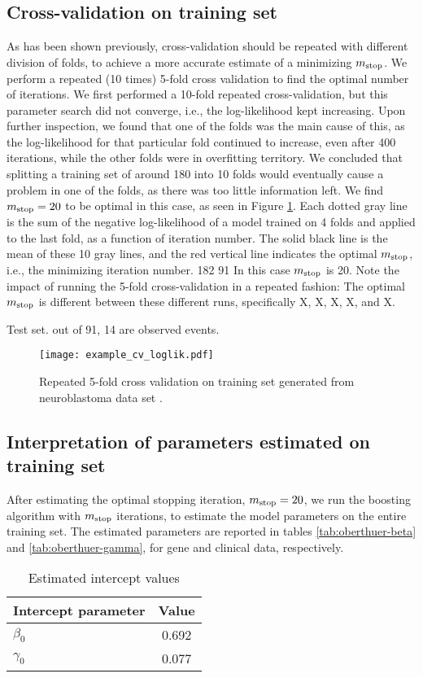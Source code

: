 \subsection{Cross-validation on training set}
As has been shown previously, cross-validation should be repeated with different division of folds, to achieve a more accurate estimate of a minimizing $m_{\text{stop}}$.
We perform a repeated (10 times) 5-fold cross validation to find the optimal number of iterations.
We first performed a 10-fold repeated cross-validation, but this parameter search did not converge, i.e., the log-likelihood kept increasing.
Upon further inspection, we found that one of the folds was the main cause of this, as the log-likelihood for that particular fold continued to increase, even after 400 iterations, while the other folds were in overfitting territory.
We concluded that splitting a training set of around 180 into 10 folds would eventually cause a problem in one of the folds, as there was too little information left.
We find $m_{\text{stop}}=20$ to be optimal in this case, as seen in Figure \ref{fig:neuroblastoma-cv}.
Each dotted gray line is the sum of the negative log-likelihood of a model trained on 4 folds and applied to the last fold, as a function of iteration number.
The solid black line is the mean of these 10 gray lines, and the red vertical line indicates the optimal $m_{\text{stop}}$, i.e., the minimizing iteration number.
182 91
In this case $m_{\text{stop}}$ is 20.
Note the impact of running the 5-fold cross-validation in a repeated fashion:
The optimal $m_{\text{stop}}$ is different between these different runs, specifically X, X, X, X, and X.

Test set. 
out of 91, 14 are observed events.

\begin{figure}
\caption{Repeated 5-fold cross validation on training set generated from neuroblastoma data set \citep{oberthuer-data}.}
\label{fig:neuroblastoma-cv}
\centering\texttt{[image: example\_cv\_loglik.pdf]}
\end{figure}

\subsection{Interpretation of parameters estimated on training set}
After estimating the optimal stopping iteration, $m_{\text{stop}}=20$, we run the boosting algorithm with $m_{\text{stop}}$ iterations, to estimate the model parameters on the entire training set.
The estimated parameters are reported in tables \ref{tab:oberthuer-beta} and \ref{tab:oberthuer-gamma}, for gene and clinical data, respectively.
\begin{table}
\caption{Estimated intercept values}
\label{tab:neuroblastoma-intercepts}
\centering
\begin{tabular}{lc}
\toprule
Intercept parameter & Value\\
\hline
$\beta_0$ & 0.692 \\
$\gamma_0$ & 0.077 \\
\bottomrule
\end{tabular}
\end{table}

